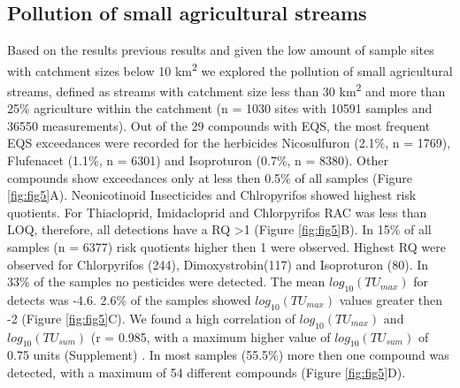 \documentclass[journal=esthag,manuscript=article]{achemso}
\begin{document}
\subsection{Pollution of small agricultural streams}
Based on the results previous results and given the low amount of sample sites with catchment sizes below 10 km\textsuperscript{2} we explored the pollution of small agricultural streams, defined as streams with catchment size less than 30 km\textsuperscript{2} and more than 25\% agriculture within the catchment (n = 1030 sites with 10591 samples and 36550 measurements).
Out of the 29 compounds with EQS, the most frequent EQS exceedances were recorded for the herbicides Nicosulfuron (2.1\%, n = 1769), Flufenacet (1.1\%, n = 6301) and Isoproturon (0.7\%, n = 8380). 
Other compounds show exceedances only at less then 0.5\% of all samples (Figure \ref{fig:fig5}A).
Neonicotinoid Insecticides and Chlropyrifos showed highest risk quotients.
For Thiacloprid, Imidacloprid and Chlorpyrifos RAC was less than LOQ, therefore, all detections have a RQ \textgreater 1 (Figure \ref{fig:fig5}B). 
In 15\% of all samples (n = 6377) risk quotients higher then 1 were observed.
Highest RQ were observed for Chlorpyrifos (244), Dimoxystrobin(117) and Isoproturon (80). 
In 33\% of the samples no pesticides were detected. 
The mean $log_{10}(TU_{max})$ for detects was -4.6.
2.6\% of the samples showed $log_{10}(TU_{max})$ values greater then -2 (Figure \ref{fig:fig5}C).
We found a high correlation of $log_{10}(TU_{max})$ and $log_{10}(TU_{sum})$ (r = 0.985, with a maximum higher value of $log_{10}(TU_{sum})$ of 0.75 units (Supplement) .
In most samples (55.5\%) more then one compound was detected, with a maximum of 54 different compounds (Figure \ref{fig:fig5}D). 

\end{document}
